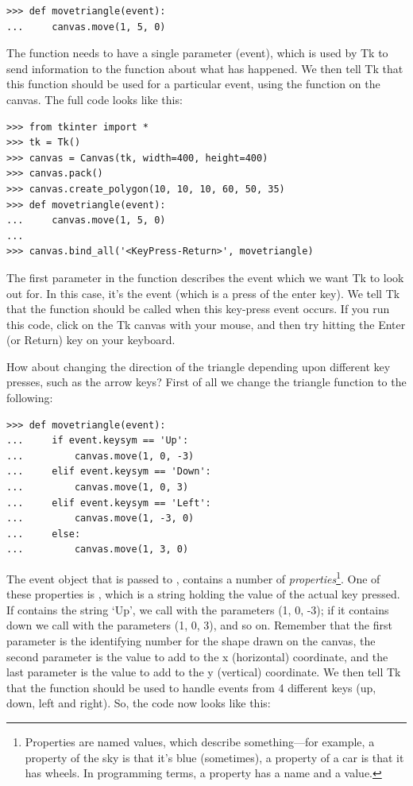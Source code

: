 \begin{Verbatim}[frame=single]
>>> def movetriangle(event):
...     canvas.move(1, 5, 0)
\end{Verbatim}

The function needs to have a single parameter (event), which is used by Tk to send information to the function about what has happened.  We then tell Tk that this function should be used for a particular event, using the  function on the canvas. The full code looks like this:

\begin{Verbatim}[frame=single]
>>> from tkinter import *
>>> tk = Tk()
>>> canvas = Canvas(tk, width=400, height=400)
>>> canvas.pack()
>>> canvas.create_polygon(10, 10, 10, 60, 50, 35)
>>> def movetriangle(event):
...     canvas.move(1, 5, 0)
...
>>> canvas.bind_all('<KeyPress-Return>', movetriangle)
\end{Verbatim}

The first parameter in the  function describes the event which we want Tk to look out for. In this case, it's the event  (which is a press of the enter key).  We tell Tk that the  function should be called when this key-press event occurs.  If you run this code, click on the Tk canvas with your mouse, and then try hitting the Enter (or Return) key on your keyboard.

How about changing the direction of the triangle depending upon different key presses, such as the arrow keys? First of all we change the  triangle function to the following:

\begin{Verbatim}[frame=single]
>>> def movetriangle(event):
...     if event.keysym == 'Up':
...         canvas.move(1, 0, -3)
...     elif event.keysym == 'Down':
...         canvas.move(1, 0, 3)
...     elif event.keysym == 'Left':
...         canvas.move(1, -3, 0)
...     else:
...         canvas.move(1, 3, 0)
\end{Verbatim}

The event object that is passed to , contains a number of \emph{properties}\footnote{Properties are named values, which describe something---for example, a property of the sky is that it's blue (sometimes), a property of a car is that it has wheels. In programming terms, a property has a name and a value.}.  One of these properties is , which is a string holding the value of the actual key pressed.  If  contains the string `Up', we call  with the parameters (1, 0, -3); if it contains down we call with the parameters (1, 0, 3), and so on.  Remember that the first parameter is the identifying number for the shape drawn on the canvas, the second parameter is the value to add to the x (horizontal) coordinate, and the last parameter is the value to add to the y (vertical) coordinate. We then tell Tk that the  function should be used to handle events from 4 different keys (up, down, left and right).  So, the code now looks like this:

